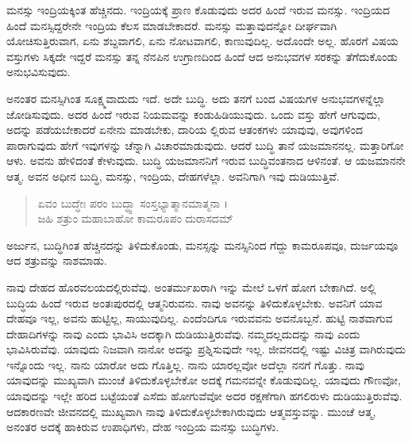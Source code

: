 ಮನಸ್ಸು ಇಂದ್ರಿಯಕ್ಕಿಂತ ಹೆಚ್ಚಿನದು. ಇಂದ್ರಿಯಕ್ಕೆ ಪ್ರಾಣ ಕೊಡುವುದು ಅದರ ಹಿಂದೆ ಇರುವ ಮನಸ್ಸು. ಇಂದ್ರಿಯದ ಹಿಂದೆ ಮನಸ್ಸಿದ್ದರೇನೇ ಇಂದ್ರಿಯ ಕೆಲಸ ಮಾಡಬೇಕಾದರೆ. ಮನಸ್ಸು ಮತ್ತಾವುದನ್ನೋ ದೀರ್ಘವಾಗಿ ಯೋಚಿಸುತ್ತಿರುವಾಗ, ಏನು ಶಬ್ದವಾಗಲಿ, ಏನು ನೋಟವಾಗಲಿ, ಕಾಣುವುದಿಲ್ಲ. ಅದೊಂದೇ ಅಲ್ಲ. ಹೊರಗೆ ವಿಷಯ ವಸ್ತುಗಳು ಸಿಕ್ಕದೇ ಇದ್ದರೆ ಮನಸ್ಸು ತನ್ನ ನೆನಪಿನ ಉಗ್ರಾಣದಿಂದ ಹಿಂದೆ ಆದ ಅನುಭವಗಳ ಸರಕನ್ನು ತೆಗೆದುಕೊಂಡು ಅನುಭವಿಸುವುದು.

ಅನಂತರ ಮನಸ್ಸಿಗಿಂತ ಸೂಕ್ಷ್ಮವಾದುದು ಇದೆ. ಅದೇ ಬುದ್ಧಿ. ಅದು ತನಗೆ ಬಂದ ವಿಷಯಗಳ ಅನುಭವಗಳನ್ನೆಲ್ಲಾ ಜೋಡಿಸುವುದು. ಅದರ ಹಿಂದೆ ಇರುವ ನಿಯಮವನ್ನು ಕಂಡುಹಿಡಿಯುವುದು. ಒಂದು ವಸ್ತು ಹೇಗೆ ಆಗುವುದು, ಅದನ್ನು ಪಡೆಯಬೇಕಾದರೆ ಏನೇನು ಮಾಡಬೇಕು, ದಾರಿಯ ಲ್ಲಿರುವ ಆತಂಕಗಳು ಯಾವುವು, ಅವುಗಳಿಂದ ಪಾರಾಗುವುದು ಹೇಗೆ ಇವುಗಳನ್ನು ಚೆನ್ನಾಗಿ ವಿಚಾರಮಾಡುವುದು. ಆದರೆ ಬುದ್ಧಿ ತಾನೆ ಯಜಮಾನನಲ್ಲ. ಮತ್ತಾರಿಗೋ ಆಳು. ಅವನು ಹೇಳಿದಂತೆ ಕೇಳುವುದು. ಬುದ್ಧಿ ಯಜಮಾನನಿಗೆ ಇರುವ ಬುದ್ಧಿವಂತನಾದ ಆಳಿನಂತೆ. ಆ ಯಜಮಾನನೇ ಆತ್ಮ. ಅವನ ಅಧೀನ ಬುದ್ಧಿ, ಮನಸ್ಸು, ಇಂದ್ರಿಯ, ದೇಹಗಳೆಲ್ಲಾ. ಅವನಿಗಾಗಿ ಇವು ದುಡಿಯುತ್ತಿವೆ.

\begin{verse}
ಏವಂ ಬುದ್ಧೇಃ ಪರಂ ಬುದ್ಧ್ವಾ ಸಂಸ್ತಭ್ಯಾತ್ಮಾನಮಾತ್ಮನಾ ।\\ಜಹಿ ಶತ್ರುಂ ಮಹಾಬಾಹೋ ಕಾಮರೂಪಂ ದುರಾಸದಮ್ 
\end{verse}

{\small ಅರ್ಜುನ, ಬುದ್ಧಿಗಿಂತ ಹೆಚ್ಚಿನದನ್ನು ತಿಳಿದುಕೊಂಡು, ಮನಸ್ಸನ್ನು ಮನಸ್ಸಿನಿಂದ ಗೆದ್ದು ಕಾಮರೂಪವೂ, ದುರ್ಜಯವೂ ಆದ ಶತ್ರುವನ್ನು ನಾಶಮಾಡು.}

ನಾವು ದೇಹದ ಹೊರವಲಯದಲ್ಲಿರುವೆವು. ಅಂತರ್ಮುಖರಾಗಿ ಇನ್ನು ಮೇಲೆ ಒಳಗೆ ಹೋಗ ಬೇಕಾಗಿದೆ. ಅಲ್ಲಿ ಬುದ್ಧಿಯ ಹಿಂದೆ ಇರುವ ಅಂತಃಪುರದಲ್ಲಿ ಆತ್ಮನಿರುವನು. ನಾವು ಅವನನ್ನು ತಿಳಿದುಕೊಳ್ಳಬೇಕು. ಅವನಿಗೆ ಯಾವ ದೇಹವೂ ಇಲ್ಲ, ಅವನು ಹುಟ್ಟಿಲ್ಲ, ಸಾಯುವುದಿಲ್ಲ. ಎಂದೆಂದಿಗೂ ಇರುವವನು ಅವನೊಬ್ಬನೆ. ಹುಟ್ಟಿ ನಾಶವಾಗುವ ದೇಹಾದಿಗಳನ್ನು ನಾವು ಎಂದು ಭಾವಿಸಿ ಅದಕ್ಕಾಗಿ ದುಡಿಯುತ್ತಿರುವೆವು. ನಮ್ಮದಲ್ಲದುದನ್ನು ನಾವು ಎಂದು ಭಾವಿಸಿರುವೆವು. ಯಾವುದು ನಿಜವಾಗಿ ನಾನೋ ಅದನ್ನು ಪ್ರಶ್ನಿಸುವುದೇ ಇಲ್ಲ. ಜೀವನದಲ್ಲಿ ಇಷ್ಟು ವಿಚಿತ್ರ ವಾಗಿರುವುದು ಇನ್ನೊಂದು ಇಲ್ಲ. ನಾನು ಯಾರೋ ಅದು ಗೊತ್ತಿಲ್ಲ. ನಾನು ಯಾರಲ್ಲವೋ ಅದೆಲ್ಲಾ ನನಗೆ ಗೊತ್ತು. ನಾವು ಯಾವುದನ್ನು ಮುಖ್ಯವಾಗಿ ಮುಂಚೆ ತಿಳಿದುಕೊಳ್ಳಬೇಕೋ ಅದಕ್ಕೆ ಗಮನವನ್ನೇ ಕೊಡುವುದಿಲ್ಲ. ಯಾವುದು ಗೌಣವೋ, ಯಾವುದನ್ನು ಇಲ್ಲೇ ಹರಿದ ಬಟ್ಟೆಯಂತೆ ಎಸೆದು ಹೋಗುವೆವೋ ಅದರ ರಕ್ಷಣೆಗಾಗಿ ಹಗಲಿರುಳು ದುಡಿಯುತ್ತಿರುವೆವು. ಆದಕಾರಣವೇ ಜೀವನದಲ್ಲಿ ಮುಖ್ಯವಾಗಿ ನಾವು ತಿಳಿದುಕೊಳ್ಳಬೇಕಾಗಿರುವುದು ಆತ್ಮವಸ್ತುವನ್ನು. ಮುಂಚೆ ಆತ್ಮ, ಅನಂತರ ಅದಕ್ಕೆ ಹಾಕಿರುವ ಉಪಾಧಿಗಳು, ದೇಹ ಇಂದ್ರಿಯ ಮನಸ್ಸು ಬುದ್ಧಿಗಳು.

